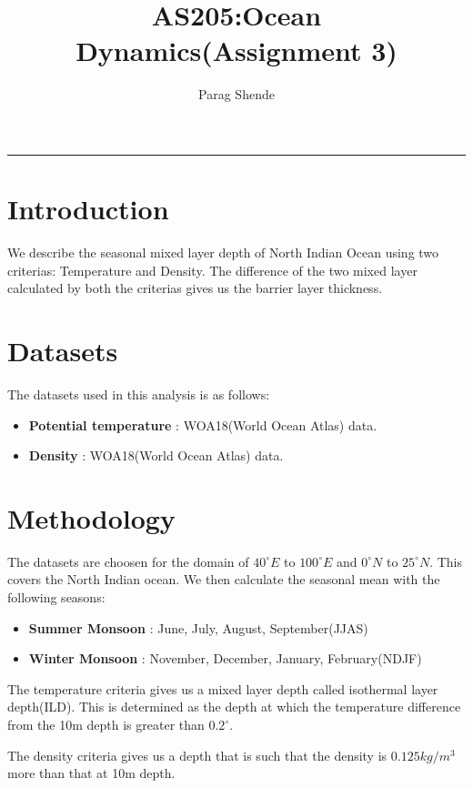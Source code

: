 \documentclass[20pt]{article}
\title{AS205:Ocean Dynamics(Assignment 3)}
\author{Parag Shende}
\begin{document}
\maketitle
\hrule

\section*{Introduction}

We describe the seasonal mixed layer depth of North Indian Ocean using two criterias: Temperature and Density. The difference of the two
mixed layer calculated by both the criterias gives us the barrier layer thickness.

\section*{Datasets}

The datasets used in this analysis is as follows:

\begin{itemize}
    \item \textbf{Potential temperature} : WOA18(World Ocean Atlas) data.
    \item \textbf{Density} : WOA18(World Ocean Atlas) data.
\end{itemize}

\section*{Methodology}

The datasets are choosen for the domain of $40^{\circ} E$ to $100^{\circ}E$ and $0^{\circ} N$ to $25^{\circ} N$. This covers the
North Indian ocean. We then calculate the seasonal mean with the following seasons:

\begin{itemize}
    \item \textbf{Summer Monsoon} : June, July, August, September(JJAS)
    \item \textbf{Winter Monsoon} : November, December, January, February(NDJF)
\end{itemize}


The temperature criteria gives us a mixed layer depth called isothermal layer depth(ILD). This is determined as the depth at which the 
temperature difference from the 10m depth is greater than $0.2^{\circ}$.


The density criteria gives us a depth that is such that the density is $0.125 kg/m^{3}$ more than that at 10m depth.
\end{document}
